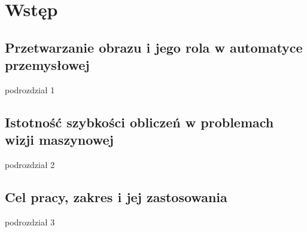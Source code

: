 \documentclass[document.tex]{subfiles}
\begin{document}
\chapter{Wstęp}

\section{Przetwarzanie obrazu i jego rola w automatyce przemysłowej}
podrozdział 1
\section{Istotność szybkości obliczeń w problemach wizji maszynowej}
podrozdział 2
\section{Cel pracy, zakres i jej zastosowania}
podrozdział 3
\end{document}
